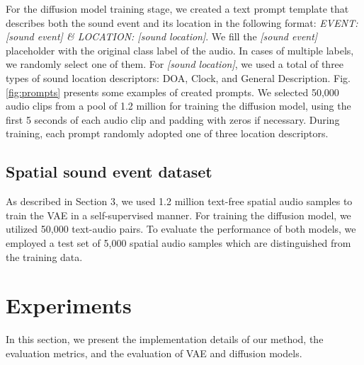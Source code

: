 \documentclass{IEEEtran}
\begin{document}
For the diffusion model training stage, we created a text prompt template that describes both the sound event and its location in the following format: \emph{EVENT: [sound event] \& LOCATION: [sound location]}. We fill the \emph{[sound event]} placeholder with the original class label of the audio. In cases of multiple labels, we randomly select one of them. For \emph{[sound location]}, we used a total of three types of sound location descriptors: DOA, Clock, and General Description. Fig. \ref{fig:prompts} presents some examples of created prompts. We selected 50,000 audio clips from a pool of 1.2 million for training the diffusion model, using the first 5 seconds of each audio clip and padding with zeros if necessary. During training, each prompt randomly adopted one of three location descriptors. %


\subsection{Spatial sound event dataset}
As described in Section 3, we used 1.2 million text-free spatial audio samples to train the VAE in a self-supervised manner. For training the diffusion model, we utilized 50,000 text-audio pairs. To evaluate the performance of both models, we employed a test set of 5,000 spatial audio samples which are distinguished from the training data.

\section{Experiments}
\label{sec:exp}
In this section, we present the implementation details of our method, the evaluation metrics, and the evaluation of VAE and diffusion models.
\end{document}
